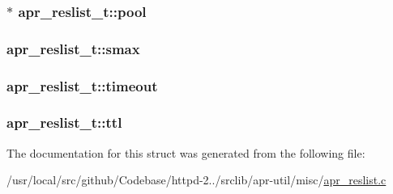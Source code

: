 \subsubsection[{\texorpdfstring{pool}{pool}}]{$\ast$ apr\+\_\+reslist\+\_\+t\+::pool}\hypertarget{structapr__reslist__t_a7832b9ebdaf77598d59cba9a3fd75684}{}\label{structapr__reslist__t_a7832b9ebdaf77598d59cba9a3fd75684}
\subsubsection[{\texorpdfstring{smax}{smax}}]{ apr\+\_\+reslist\+\_\+t\+::smax}\hypertarget{structapr__reslist__t_a4b86641af06860616589bd785920cf8f}{}\label{structapr__reslist__t_a4b86641af06860616589bd785920cf8f}
\subsubsection[{\texorpdfstring{timeout}{timeout}}]{ apr\+\_\+reslist\+\_\+t\+::timeout}\hypertarget{structapr__reslist__t_a679ecd7a80b2e44d215bae44ec698a42}{}\label{structapr__reslist__t_a679ecd7a80b2e44d215bae44ec698a42}
\subsubsection[{\texorpdfstring{ttl}{ttl}}]{ apr\+\_\+reslist\+\_\+t\+::ttl}\hypertarget{structapr__reslist__t_adae72def7c0823ed2e44aa444e1d424a}{}\label{structapr__reslist__t_adae72def7c0823ed2e44aa444e1d424a}


The documentation for this struct was generated from the following file\+:\begin{DoxyCompactItemize}
\item 
/usr/local/src/github/\+Codebase/httpd-\/2../srclib/apr-\/util/misc/\hyperlink{apr__reslist_8c}{apr\+\_\+reslist.\+c}\end{DoxyCompactItemize}
